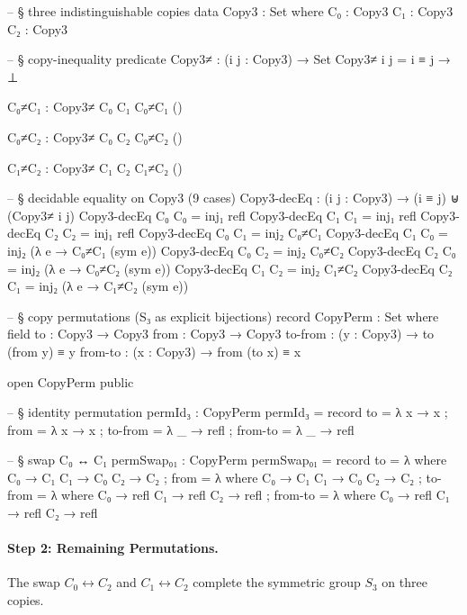 \documentclass[11pt,a4paper]{book}
\begin{document}
\begin{code}
-- § three indistinguishable copies
data Copy3 : Set where
  C₀ : Copy3
  C₁ : Copy3
  C₂ : Copy3

-- § copy-inequality predicate
Copy3≠ : (i j : Copy3) → Set
Copy3≠ i j = i ≡ j → ⊥

C₀≠C₁ : Copy3≠ C₀ C₁
C₀≠C₁ ()

C₀≠C₂ : Copy3≠ C₀ C₂
C₀≠C₂ ()

C₁≠C₂ : Copy3≠ C₁ C₂
C₁≠C₂ ()

-- § decidable equality on Copy3 (9 cases)
Copy3-decEq : (i j : Copy3) → (i ≡ j) ⊎ (Copy3≠ i j)
Copy3-decEq C₀ C₀ = inj₁ refl
Copy3-decEq C₁ C₁ = inj₁ refl
Copy3-decEq C₂ C₂ = inj₁ refl
Copy3-decEq C₀ C₁ = inj₂ C₀≠C₁
Copy3-decEq C₁ C₀ = inj₂ (λ e → C₀≠C₁ (sym e))
Copy3-decEq C₀ C₂ = inj₂ C₀≠C₂
Copy3-decEq C₂ C₀ = inj₂ (λ e → C₀≠C₂ (sym e))
Copy3-decEq C₁ C₂ = inj₂ C₁≠C₂
Copy3-decEq C₂ C₁ = inj₂ (λ e → C₁≠C₂ (sym e))

-- § copy permutations (S₃ as explicit bijections)
record CopyPerm : Set where
  field
    to       : Copy3 → Copy3
    from     : Copy3 → Copy3
    to-from  : (y : Copy3) → to (from y) ≡ y
    from-to  : (x : Copy3) → from (to x) ≡ x

open CopyPerm public

-- § identity permutation
permId₃ : CopyPerm
permId₃ = record
  { to = λ x → x
  ; from = λ x → x
  ; to-from = λ _ → refl
  ; from-to = λ _ → refl
  }

-- § swap C₀ ↔ C₁
permSwap₀₁ : CopyPerm
permSwap₀₁ = record
  { to = λ where
      C₀ → C₁
      C₁ → C₀
      C₂ → C₂
  ; from = λ where
      C₀ → C₁
      C₁ → C₀
      C₂ → C₂
  ; to-from = λ where
      C₀ → refl
      C₁ → refl
      C₂ → refl
  ; from-to = λ where
      C₀ → refl
      C₁ → refl
      C₂ → refl
  }
\end{code}

\paragraph{Step 2: Remaining Permutations.}
The swap $C_0 \leftrightarrow C_2$ and $C_1 \leftrightarrow C_2$
complete the symmetric group $S_3$ on three copies.
\end{document}
